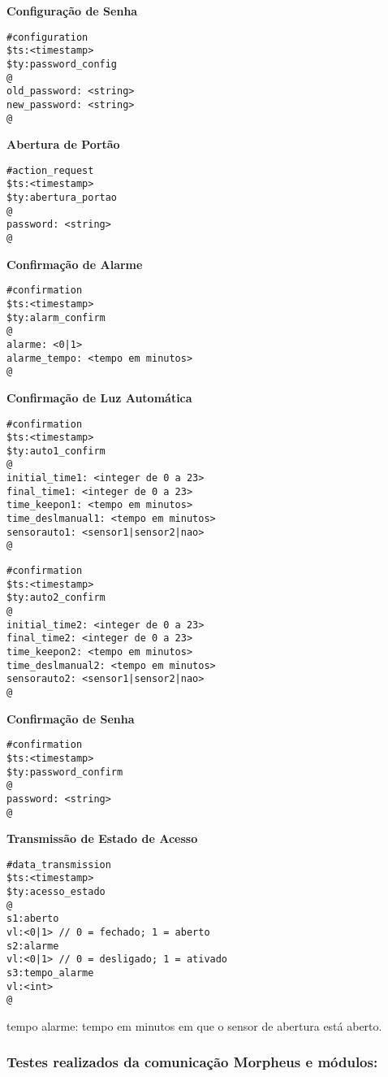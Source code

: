 \textbf{Configuração de Senha}
\begin{lstlisting}
#configuration
$ts:<timestamp>
$ty:password_config
@
old_password: <string>
new_password: <string>
@
\end{lstlisting}

\textbf{Abertura de Portão}
\begin{lstlisting}
#action_request
$ts:<timestamp>
$ty:abertura_portao
@
password: <string>
@
\end{lstlisting}

\textbf{Confirmação de Alarme}
\begin{lstlisting}
#confirmation
$ts:<timestamp>
$ty:alarm_confirm
@
alarme: <0|1>
alarme_tempo: <tempo em minutos>
@
\end{lstlisting}

\textbf{Confirmação de Luz Automática}
\begin{lstlisting}
#confirmation
$ts:<timestamp>
$ty:auto1_confirm
@
initial_time1: <integer de 0 a 23>
final_time1: <integer de 0 a 23>
time_keepon1: <tempo em minutos>
time_deslmanual1: <tempo em minutos>
sensorauto1: <sensor1|sensor2|nao>
@
\end{lstlisting}

\begin{lstlisting}
#confirmation
$ts:<timestamp>
$ty:auto2_confirm
@
initial_time2: <integer de 0 a 23>
final_time2: <integer de 0 a 23>
time_keepon2: <tempo em minutos>
time_deslmanual2: <tempo em minutos>
sensorauto2: <sensor1|sensor2|nao>
@
\end{lstlisting}

\textbf{Confirmação de Senha}
\begin{lstlisting}
#confirmation
$ts:<timestamp>
$ty:password_confirm
@
password: <string>
@
\end{lstlisting}

\textbf{Transmissão de Estado de Acesso}
\begin{lstlisting}
#data_transmission
$ts:<timestamp>
$ty:acesso_estado
@
s1:aberto
vl:<0|1> // 0 = fechado; 1 = aberto
s2:alarme
vl:<0|1> // 0 = desligado; 1 = ativado
s3:tempo_alarme
vl:<int>
@
\end{lstlisting}

tempo alarme: tempo em minutos em que o sensor de abertura está aberto.

\subsubsection{Testes realizados da comunicação Morpheus e módulos:}

